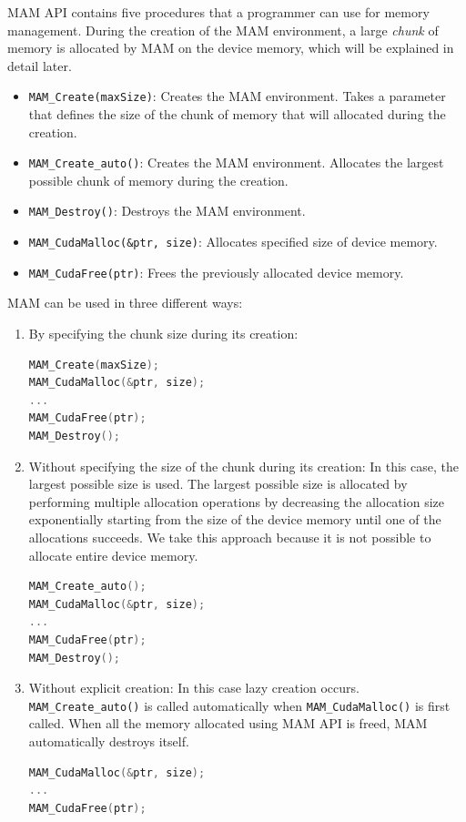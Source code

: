\documentclass[conference]{IEEEtran}
\def\code#1{\texttt{#1}}
\begin{document}
MAM API contains five procedures that a programmer can use for memory management. 
During the creation of the MAM environment, a large \emph{chunk} of memory is allocated by MAM on the device memory, which will be explained in detail later. 

\begin{itemize} 
\item \code{MAM\_Create(maxSize)}: Creates the MAM environment. Takes a parameter that defines the size of the chunk of memory that will allocated during the creation.

\item \code{MAM\_Create\_auto()}: Creates the MAM environment. Allocates the largest possible chunk of memory during the creation.

\item \code{MAM\_Destroy()}: Destroys the MAM environment.

\item \code{MAM\_CudaMalloc(\&ptr, size)}: Allocates specified size of device memory.

\item \code{MAM\_CudaFree(ptr)}: Frees the previously allocated device memory.
\end{itemize} 

MAM can be used in three different ways:

\begin{enumerate} 
\item {By specifying the chunk size during its creation:}
\begin{lstlisting}[language=C]
MAM_Create(maxSize);
MAM_CudaMalloc(&ptr, size);
...
MAM_CudaFree(ptr);
MAM_Destroy();
\end{lstlisting}

\item {Without specifying the size of the chunk during its creation:}
In this case, the largest possible size is used. The largest possible size is allocated by performing multiple allocation operations by decreasing the allocation size exponentially starting from the size of the device memory until one of the allocations succeeds. We 
take this approach because it is not possible to allocate entire device memory. 

\begin{lstlisting}[language=C]
MAM_Create_auto();
MAM_CudaMalloc(&ptr, size);
...
MAM_CudaFree(ptr);
MAM_Destroy();
\end{lstlisting}

\item{Without explicit creation:}
In this case lazy creation occurs. \code{MAM\_Create\_auto()} is called automatically when \code{MAM\_CudaMalloc()} is first called. When all the memory allocated using MAM API is  freed, MAM automatically destroys itself.

\begin{lstlisting}[language=C]
MAM_CudaMalloc(&ptr, size);
...
MAM_CudaFree(ptr);
\end{lstlisting}
\end{enumerate} 
\end{document}
